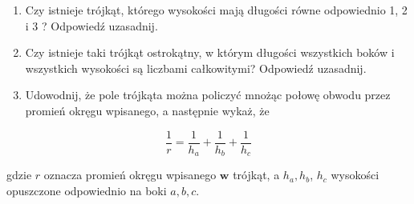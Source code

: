 \documentclass[10pt]{article}
\begin{document}
\begin{enumerate}
  \item Czy istnieje trójkąt, którego wysokości mają długości równe odpowiednio 1, 2 i 3 ? Odpowiedź uzasadnij.
  \item Czy istnieje taki trójkąt ostrokątny, w którym długości wszystkich boków i wszystkich wysokości są liczbami całkowitymi? Odpowiedź uzasadnij.
  \item Udowodnij, że pole trójkąta można policzyć mnożąc połowę obwodu przez promień okręgu wpisanego, a następnie wykaż, że
\end{enumerate}

\[
\frac{1}{r}=\frac{1}{h_{a}}+\frac{1}{h_{b}}+\frac{1}{h_{c}}
\]

gdzie \(r\) oznacza promień okręgu wpisanego \(\mathbf{w}\) trójkąt, a \(h_{a}, h_{b}\), \(h_{c}\) wysokości opuszczone odpowiednio na boki \(a, b, c\).
\end{document}
